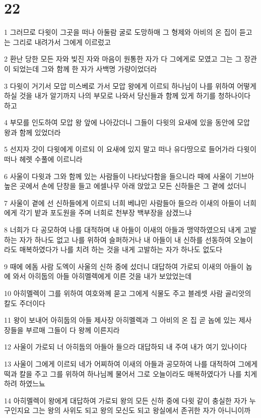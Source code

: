 \chapter{22}

\par 1 그러므로 다윗이 그곳을 떠나 아둘람 굴로 도망하매 그 형제와 아비의 온 집이 듣고는 그리로 내려가서 그에게 이르렀고
\par 2 환난 당한 모든 자와 빚진 자와 마음이 원통한 자가 다 그에게로 모였고 그는 그 장관이 되었는데 그와 함께 한 자가 사백명 가량이었더라
\par 3 다윗이 거기서 모압 미스베로 가서 모압 왕에게 이르되 하나님이 나를 위하여 어떻게 하실 것을 내가 알기까지 나의 부모로 나와서 당신들과 함께 있게 하기를 청하나이다 하고
\par 4 부모를 인도하여 모압 왕 앞에 나아갔더니 그들이 다윗의 요새에 있을 동안에 모압 왕과 함께 있었더라
\par 5 선지자 갓이 다윗에게 이르되 이 요새에 있지 말고 떠나 유다땅으로 들어가라 다윗이 떠나 헤렛 수풀에 이르니라
\par 6 사울이 다윗과 그와 함께 있는 사람들이 나타났다함을 들으니라 때에 사울이 기브아 높은 곳에서 손에 단창을 들고 에셀나무 아래 앉았고 모든 신하들은 그 곁에 섰더니
\par 7 사울이 곁에 선 신하들에게 이르되 너희 베냐민 사람들아 들으라 이새의 아들이 너희에게 각기 밭과 포도원을 주며 너희로 천부장 백부장을 삼겠느냐
\par 8 너희가 다 공모하여 나를 대적하며 내 아들이 이새의 아들과 맹약하였으되 내게 고발하는 자가 하나도 없고 나를 위하여 슬퍼하거나 내 아들이 내 신하를 선동하여 오늘이라도 매복하였다가 나를 치려 하는 것을 내게 고발하는 자가 하나도 없도다
\par 9 때에 에돔 사람 도엑이 사울의 신하 중에 섰더니 대답하여 가로되 이새의 아들이 놉에 와서 아히둡의 아들 아히멜렉에게 이른 것을 내가 보았었는데
\par 10 아히멜렉이 그를 위하여 여호와께 묻고 그에게 식물도 주고 블레셋 사람 골리앗의 칼도 주더이다
\par 11 왕이 보내어 아히둡의 아들 제사장 아히멜렉과 그 아비의 온 집 곧 놉에 있는 제사장들을 부르매 그들이 다 왕께 이른지라
\par 12 사울이 가로되 너 아히둡의 아들아 들으라 대답하되 내 주여 내가 여기 있나이다
\par 13 사울이 그에게 이르되 네가 어찌하여 이새의 아들과 공모하여 나를 대적하여 그에게 떡과 칼을 주고 그를 위하여 하나님께 물어서 그로 오늘이라도 매복하였다가 나를 치게 하려 하였느뇨
\par 14 아히멜렉이 왕에게 대답하여 가로되 왕의 모든 신하 중에 다윗 같이 충실한 자가 누구인지요 그는 왕의 사위도 되고 왕의 모신도 되고 왕실에서 존귀한 자가 아니니이까
